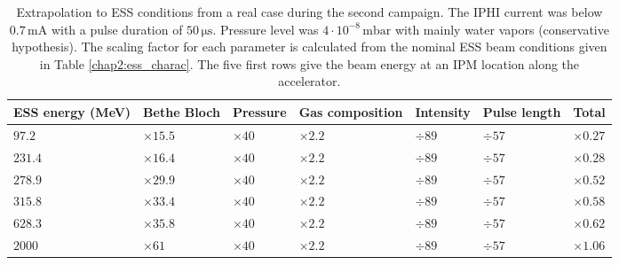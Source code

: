 \begin{table}[ht]
  \centering
  \caption[Extrapolation to ESS conditions from a real case during the second campaign]
  {Extrapolation to ESS conditions from a real case during the second campaign.
    The IPHI current was below $0.7\,\mathrm{mA}$ with a pulse duration of $50\, \mathrm{\mu s}$. Pressure level was $4 \cdot 10^{-8}\,\mathrm{mbar}$ with mainly water vapors (conservative hypothesis). The scaling factor for each parameter is calculated from the nominal ESS beam conditions given in Table \ref{chap2:ess_charac}. The five first rows give the beam energy at an IPM location along the accelerator.}
  \label{chap4:extrapolationMCP}
  \begin{tabularx}{\linewidth}{XXXXXXX}
    \toprule    ESS energy (MeV) & Bethe Bloch   & Pressure     & Gas composition & Intensity & Pulse length & Total         \\
    \midrule
    \(97.2\)                     & $\times 15.5$ & $\times 40 $ & $\times 2.2$    & $\div89$  & $\div57$     & $\times 0.27$ \\
    \(231.4\)                    & $\times 16.4$ & $\times 40$  & $\times 2.2$    & $\div89$  & $\div57$     & $\times 0.28$ \\
    \(278.9\)                    & $\times 29.9$ & $\times 40$  & $\times 2.2$    & $\div89$  & $\div57$     & $\times 0.52$ \\
    \(315.8\)                    & $\times 33.4$ & $\times 40$  & $\times 2.2$    & $\div89$  & $\div57$     & $\times 0.58$ \\
    \(628.3\)                    & $\times 35.8$ & $\times 40$  & $\times 2.2$    & $\div89$  & $\div57$     & $\times 0.62$ \\
    \(2000\)                   & $\times 61$   & $\times 40$  & $\times 2.2$    & $\div89$  & $\div57$     & $\times 1.06$ \\
    \bottomrule
  \end{tabularx}
\end{table}